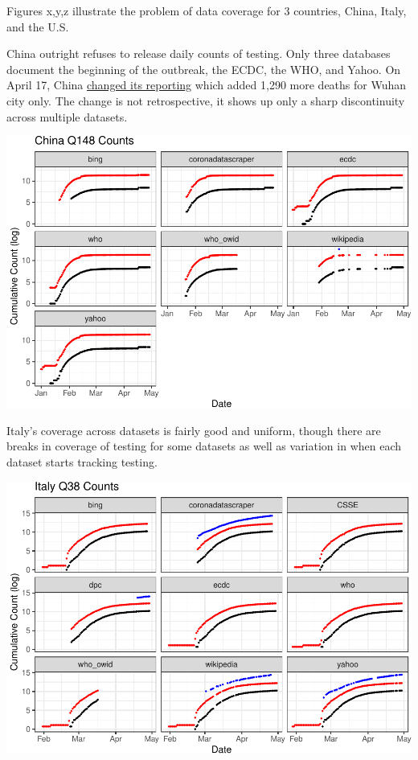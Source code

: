 \documentclass[
]{book}
\begin{document}
Figures x,y,z illustrate the problem of data coverage for 3 countries, China, Italy, and the U.S.

China outright refuses to release daily counts of testing. Only three databases document the beginning of the outbreak, the ECDC, the WHO, and Yahoo. On April 17, China \href{http://en.nhc.gov.cn/2020-04/17/c_79285.htm}{changed its reporting} which added 1,290 more deaths for Wuhan city only. The change is not retrospective, it shows up only a sharp discontinuity across multiple datasets.

\begin{center}\includegraphics[width=1\linewidth]{HowToBeCarefulWithCovid19Counts_files/figure-latex/p_over_time_by_source_china1-1} \end{center}

Italy's coverage across datasets is fairly good and uniform, though there are breaks in coverage of testing for some datasets as well as variation in when each dataset starts tracking testing.

\begin{center}\includegraphics[width=1\linewidth]{HowToBeCarefulWithCovid19Counts_files/figure-latex/p_over_time_by_source_italy1-1} \end{center}
\end{document}
